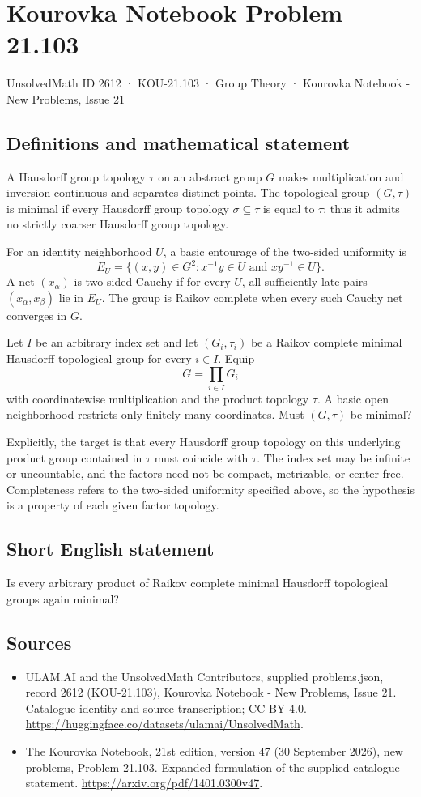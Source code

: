 \documentclass[11pt,a4paper]{article}
\begin{document}
\section*{Kourovka Notebook Problem 21.103}\label{2612}
{\small UnsolvedMath ID 2612 · KOU-21.103 · Group Theory · Kourovka Notebook - New Problems, Issue 21}
\subsection{Definitions and mathematical statement}
A Hausdorff group topology $\tau$ on an abstract group $G$ makes multiplication and inversion continuous and separates distinct points. The topological group $(G,\tau)$ is minimal if every Hausdorff group topology $\sigma\subseteq\tau$ is equal to $\tau$; thus it admits no strictly coarser Hausdorff group topology.

For an identity neighborhood $U$, a basic entourage of the two-sided uniformity is
\[
 E_U=\{(x,y)\in G^2:x^{-1}y\in U\text{ and }xy^{-1}\in U\}.
\]
A net $(x_\alpha)$ is two-sided Cauchy if for every $U$, all sufficiently late pairs $(x_\alpha,x_\beta)$ lie in $E_U$. The group is Raikov complete when every such Cauchy net converges in $G$.

Let $I$ be an arbitrary index set and let $(G_i,\tau_i)$ be a Raikov complete minimal Hausdorff topological group for every $i\in I$. Equip
\[
 G=\prod_{i\in I}G_i
\]
with coordinatewise multiplication and the product topology $\tau$. A basic open neighborhood restricts only finitely many coordinates. Must $(G,\tau)$ be minimal?

Explicitly, the target is that every Hausdorff group topology on this underlying product group contained in $\tau$ must coincide with $\tau$. The index set may be infinite or uncountable, and the factors need not be compact, metrizable, or center-free. Completeness refers to the two-sided uniformity specified above, so the hypothesis is a property of each given factor topology.
\subsection{Short English statement}
Is every arbitrary product of Raikov complete minimal Hausdorff topological groups again minimal?
\subsection{Sources}
\begin{itemize}
\item[S1] ULAM.AI and the UnsolvedMath Contributors, supplied problems.json, record 2612 (KOU-21.103), Kourovka Notebook - New Problems, Issue 21. Catalogue identity and source transcription; CC BY 4.0.
\url{https://huggingface.co/datasets/ulamai/UnsolvedMath}.
\item[S2] The Kourovka Notebook, 21st edition, version 47 (30 September 2026), new problems, Problem 21.103. Expanded formulation of the supplied catalogue statement.
\url{https://arxiv.org/pdf/1401.0300v47}.
\end{itemize}
\end{document}

